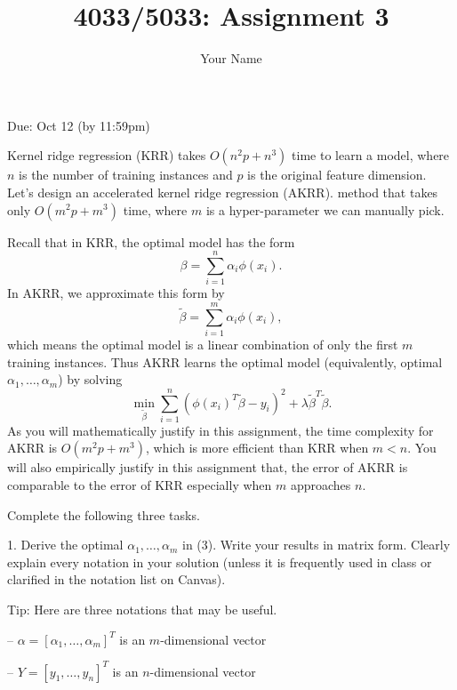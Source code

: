 \documentclass{llncs}
\title{4033/5033: Assignment 3}
\author{Your Name}
\institute{}
\begin{document}
\maketitle 

\setlength\parindent{0pt} 
\setlength{\parskip}{10pt}

Due: Oct 12 (by 11:59pm)

Kernel ridge regression (KRR) takes $O(n^2 p + n^3)$ time 
to learn a model, where $n$ is the number of training 
instances and $p$ is the original feature dimension. 
Let's design an accelerated kernel ridge regression (AKRR). 
method that takes only $O(m^2 p + m^3)$ time, where $m$ is 
a hyper-parameter we can manually pick. 

Recall that in KRR, the optimal model has the form 
\begin{equation}
\beta = {\sum}_{i = 1}^n \alpha_i \phi(x_i).      
\end{equation}
In AKRR, we approximate this form by 
\begin{equation}
\tilde{\beta} = {\sum}_{i = 1}^m \alpha_i \phi(x_i), 
\end{equation}
which means the optimal model is a linear combination 
of only the first $m$ training instances. Thus AKRR learns
the optimal model (equivalently, optimal $\alpha_1, \ldots, 
\alpha_m$) by solving 
\begin{equation}
\min_{\tilde{\beta}} {\sum}_{i=1}^n (\phi(x_i)^{T} \tilde{\beta} - y_i)^2 + \lambda \tilde{\beta}^T \tilde{\beta}.      
\end{equation}
As you will mathematically justify in this assignment, 
the time complexity for AKRR is $O(m^2 p + m^3)$, which 
is more efficient than KRR when $m < n$. You will also 
empirically justify in this assignment that, the error 
of AKRR is comparable to the error of KRR especially 
when $m$ approaches $n$. 

Complete the following three tasks. 

1. Derive the optimal $\alpha_1, \ldots, \alpha_m$ in (3). 
Write your results in matrix form. Clearly explain every 
notation in your solution (unless it is frequently used in class or clarified in the notation list on Canvas). 

Tip: Here are three notations that may be useful.  

-- $\alpha = [\alpha_1, \ldots, \alpha_m]^T$ is an 
$m$-dimensional vector

-- $Y = [y_1, \ldots, y_n]^T$ is an 
$n$-dimensional vector
\end{document}
